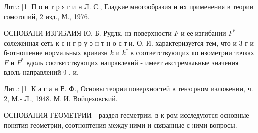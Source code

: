 \documentclass[10pt]{article}
\begin{document}
Лuт.: [1] П о н т р я г и н Л. С., Гладкие многообразия и их применения в теории гомотопий, 2 изд., М., 1976.

ОСНОВАНИ ИЗГИБАИЯ Ю. Б. Рудлк. на поверхности $F$ и ее изгибании $F^{*}$ солеженная сеть к о н г р у э н т н о с т и. О. И. характеризуется тем, что и 3 г и б-отношение нормальных кривизн $k$ и $k^{*}$ в соответствующих по изометрии точках $F$ и $F^{*}$ вдоль соответствующих направлений - имеет әкстремальные значения вдоль направлений 0 . и.

Лит.: [1] К а г а н В. Ф., Основы теории поверхностей в тензорном изложении, ч. 2, М.- Л., 1948. М. И. Войцеховский.

ОСНОВАНИЯ ГЕОМЕТРИИ - раздел геометрии, в к-ром исследуются основные понятия геометрии, соотноптения между ними и связанные с ними вопросы.
\end{document}
